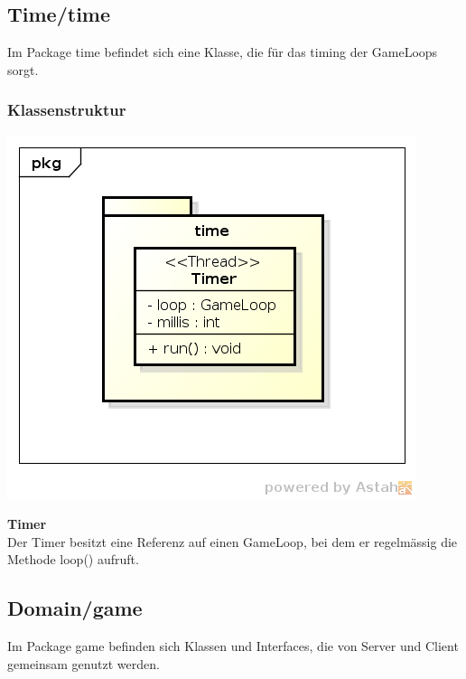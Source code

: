 \documentclass[11pt]{scrartcl}
\begin{document}
\newpage

\subsection{Time/time}
Im Package time befindet sich eine Klasse, die für das timing der GameLoops sorgt.
\subsubsection{Klassenstruktur}
\includegraphics[scale=0.8]{ClassDiagramTime}

\textbf{Timer}\\
Der Timer besitzt eine Referenz auf einen GameLoop, bei dem er regelmässig die Methode loop() aufruft.

\newpage

\subsection{Domain/game}
Im Package game befinden sich Klassen und Interfaces, die von Server und Client gemeinsam genutzt werden.
\end{document}
